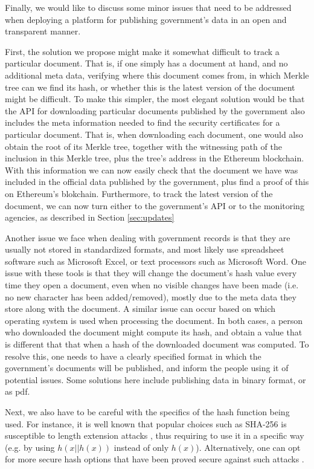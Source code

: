 	
Finally, we would like to discuss some minor issues that need to be addressed when deploying a platform for publishing government's data in an  open and transparent manner.

First, the solution we propose might make it somewhat difficult to track a particular document. That is, if one simply has a document at hand, and no additional meta data, verifying where this document comes from, in which Merkle tree can we find its hash, or whether this is the latest version of the document might be difficult. To make this simpler, the most elegant solution would be that the API for downloading particular documents published by the government also includes the meta information needed to find the security certificates for a particular document. That is, when downloading each document, one would also obtain the root of its Merkle tree, together with the witnessing path of the inclusion in this Merkle tree, plus the tree's address in the Ethereum blockchain. With this information we can now easily check that the document we have was included in the official data published by the government, plus find a proof of this on Ethereum's blokchain. Furthermore, to track the latest version of the document, we can now turn either to the government's API or to the monitoring agencies, as described in Section \ref{sec:updates}

Another issue we face when dealing with government records is that they are usually not stored in standardized formats, and most likely use spreadsheet software such as Microsoft Excel, or text processors such as Microsoft Word. One issue with these tools is that they will change the document's hash value every time they open a document, even when no visible changes have been made (i.e. no new character has been added/removed), mostly due to the meta data they store along with the document. A similar issue can occur based on which operating system is used when processing the document. In both cases, a person who downloaded the document might compute its hash, and obtain a value that is different that that when a hash of the downloaded document was computed. To resolve this, one needs to have a clearly specified format in which the government's documents will be published, and inform the people using it of potential issues. Some solutions here include publishing data in binary format, or as pdf.

Next, we also have to be careful with the specifics of the hash function being used. For instance, it is well known that popular choices such as SHA-256 is susceptible to length extension attacks \cite{lengthextension}, thus requiring to use it in a specific way (e.g. by using $h(x||h(x))$ instead of only $h(x)$). Alternatively, one can opt for more secure hash options that have been proved secure against such attacks \cite{keccak}.

